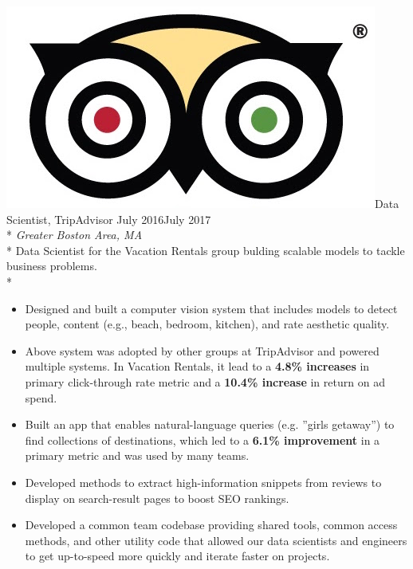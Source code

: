 \documentclass[print]{friggeri-cv} %
\newcommand{\tripicon}{\includegraphics[scale=0.05]{trip_logo.jpg}}%
\begin{document}
\begin{description} \itemsep1pt \parskip0pt 
  \item \tripicon {\largeheaderfont Data Scientist, TripAdvisor } \hfill
    {\smallheaderfont July 2016\textemdash July 2017}\\*
    {\footnotesize \emph{Greater Boston Area, MA}} \\*
    Data Scientist for the Vacation Rentals group bulding scalable models to tackle business problems.\\*
    \begin{itemize} \itemsep0.5pt \parskip0pt 
      \item Designed and built a computer vision system that includes models to
      detect people, content (e.g., beach, bedroom, kitchen), and rate aesthetic
      quality.

      \item Above system was adopted by other groups at TripAdvisor and powered multiple
      systems. In Vacation Rentals, it lead to a \textbf{4.8\% increases} in primary
      click-through rate metric and a \textbf{10.4\% increase} in return on ad spend.

      \item Built an app that enables natural-language queries (e.g. ”girls getaway”)
      to find collections of destinations, which led to a \textbf{6.1\% improvement} in a
      primary metric and was used by many teams. 

      \item Developed methods to extract high-information snippets from reviews
      to display on search-result pages to boost SEO rankings.

      \item Developed a common team codebase providing shared tools, common
      access methods, and other utility code that allowed our data scientists
      and engineers to get up-to-speed more quickly and iterate faster on
      projects.  \end{itemize}
  \end{description}
\end{document}
